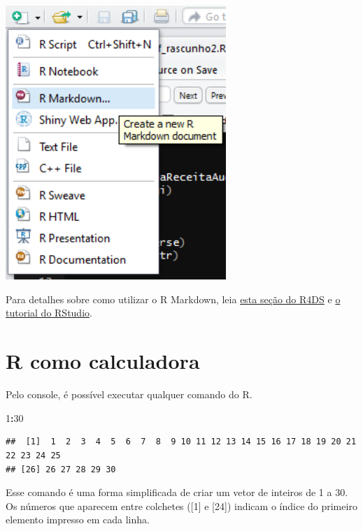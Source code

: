 \documentclass[
]{book}
\newenvironment{Shaded}{\begin{snugshade}}{\end{snugshade}}
\newcommand{\DecValTok}[1]{\textcolor[rgb]{0.00,0.00,0.81}{#1}}
\newcommand{\OperatorTok}[1]{\textcolor[rgb]{0.81,0.36,0.00}{\textbf{#1}}}
\begin{document}
\begin{center}\includegraphics[width=3.28in]{img/r-base/criar_rmarkdown} \end{center}

Para detalhes sobre como utilizar o R Markdown, leia \href{http://r4ds.had.co.nz/r-markdown.html}{esta seção do R4DS} e \href{http://rmarkdown.rstudio.com/lesson-1.html}{o tutorial do RStudio}.

\hypertarget{r-como-calculadora}{%
\section{R como calculadora}\label{r-como-calculadora}}

Pelo console, é possível executar qualquer comando do R.

\begin{Shaded}
\begin{Highlighting}[]
\DecValTok{1}\OperatorTok{:}\DecValTok{30}
\end{Highlighting}
\end{Shaded}

\begin{verbatim}
##  [1]  1  2  3  4  5  6  7  8  9 10 11 12 13 14 15 16 17 18 19 20 21 22 23 24 25
## [26] 26 27 28 29 30
\end{verbatim}

Esse comando é uma forma simplificada de criar um vetor de inteiros de 1 a 30.
Os números que aparecem entre colchetes ({[}1{]} e {[}24{]}) indicam o índice do primeiro elemento impresso em cada linha.
\end{document}
